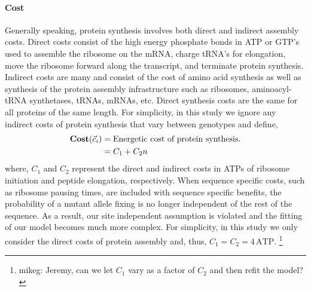 \documentclass{article}
\newcommand{\Costcveci}{\ensuremath{\Cost(\cveci)}\xspace}
\newcommand{\Cost}{\ensuremath{\text{\textbf{Cost}}}\xspace}
\newcommand{\cveci}{\ensuremath{\cvec_i}\xspace}
\newcommand{\cvec}{\ensuremath{\Vec{c}}\xspace}
\begin{document}
\paragraph*{Cost}
Generally speaking, protein synthesis involves both direct and indirect assembly costs.
Direct costs consist of the high energy phosphate bonds in ATP or GTP's used to assemble the ribosome on the mRNA, charge tRNA's for elongation, move the ribosome forward along the transcript, and terminate protein synthesis.
Indirect costs are many and consist of the cost of amino acid synthesis as well as synthesis of the protein assembly infrastructure such as ribosomes, aminoacyl-tRNA synthetases, tRNAs, mRNAs, etc.
Direct synthesis costs are the same for all proteins of the same length.
For simplicity, in this study we ignore any indirect costs of protein synthesis that vary between genotypes and define, 
\begin{align}
\label{eq:defineCost}
  \Costcveci  &= \text{Energetic cost of protein synthesis.}\\
  &= C_1 + C_2 n
\end{align}
where, $C_1$ and $C_2$ represent the direct and indirect costs in ATPs of ribosome initiation and peptide elongation, respectively.
When sequence specific costs, such as ribosome pausing times, are included with sequence specific benefits, the probability of a mutant allele fixing is no longer independent of the rest of the sequence.
As a result, our site independent assumption is violated and the fitting of our model becomes much more complex.
For simplicity, in this study we only consider the direct costs of protein assembly and, thus, $C_1 = C_2 = 4  \,\text{ATP}$.
\footnote{mikeg: Jeremy, can we let $C_1$ vary as a factor of $C_2$ and then refit the model?}
 
\end{document}
